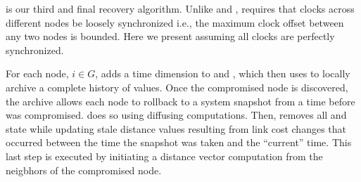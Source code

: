  is our third and final recovery algorithm. 
Unlike \second and \purges, \cpr requires that clocks across different nodes be loosely synchronized i.e., the maximum clock offset between
any two nodes is bounded. Here we present \cpr assuming all clocks are perfectly synchronized. 

For each node, $i \in G$, \cpr adds a time dimension to \minvi and \dmatrixis, which \cpr then uses to locally archive a complete history of values.  
Once the compromised node is discovered, the archive allows each node to rollback to a system snapshot from a time before \bad was compromised. 
\cpr does so using diffusing computations.  Then, \cpr removes all \badvector and \oldvector state while updating stale distance values resulting from link cost changes that
occurred between the time the snapshot was taken and the ``current'' time.
This last step is executed by initiating a distance vector computation from the neigbhors of the compromised node.




